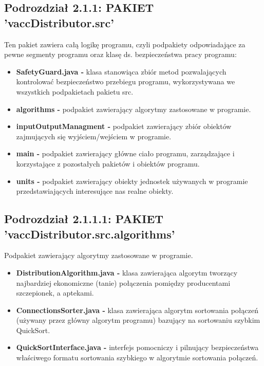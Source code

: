 \documentclass[a4paper]{article}
\begin{document}
\subsection*{Podrozdział 2.1.1: PAKIET 'vaccDistributor.src'}
Ten pakiet zawiera całą logikę programu, czyli podpakiety odpowiadające za pewne segmenty programu oraz klasę ds. bezpieczeństwa pracy programu:
\begin{itemize}
\item \textbf{SafetyGuard.java -} klasa stanowiąca zbiór metod pozwalających kontrolować bezpieczeństwo przebiegu programu, wykorzystywana we wszystkich podpakietach pakietu src.
\item \textbf{algorithms -} podpakiet zawierający algorytmy zastosowane w programie.
\item \textbf{inputOutputManagment -} podpakiet zawierający zbiór obiektów zajmujących się wyjściem/wejściem w programie.
\item \textbf{main -} podpakiet zawierający główne ciało programu, zarządzające i korzystające z pozostałych pakietów i obiektów programu.
\item \textbf{units -} podpakiet zawierający obiekty jednostek używanych w programie przedstawiających interesujące nas realne obiekty.
\end{itemize}

\subsection*{Podrozdział 2.1.1.1: PAKIET 'vaccDistributor.src.algorithms'}
Podpakiet zawierający algorytmy zastosowane w programie.
\begin{itemize}
\item \textbf{DistributionAlgorithm.java -} klasa zawierająca algorytm tworzący najbardziej ekonomiczne (tanie) połączenia pomiędzy producentami szczepionek, a aptekami.
\item \textbf{ConnectionsSorter.java -} klasa zawierająca algorytm sortowania połączeń (używany przez główny algorytm programu) bazujący na sortowaniu szybkim QuickSort.
\item \textbf{QuickSortInterface.java -} interfejs pomocniczy i pilnujący bezpieczeństwa właściwego formatu sortowania szybkiego w algorytmie sortowania połączeń.
\end{itemize}
\end{document}
